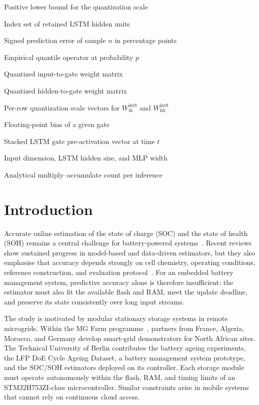 \documentclass[review]{elsarticle}
\begin{document}
\begin{description}[style=multiline,leftmargin=1.5cm,font=\bfseries]
\item[$\varepsilon_q$] Positive lower bound for the quantization scale
\item[$\mathcal{R}$] Index set of retained LSTM hidden units
\item[$e_n$] Signed prediction error of sample $n$ in percentage points
\item[$Q_p(\cdot)$] Empirical quantile operator at probability $p$
\item[$W_{\mathrm{ih}}^{\mathrm{int8}}$] Quantized input-to-gate weight matrix
\item[$W_{\mathrm{hh}}^{\mathrm{int8}}$] Quantized hidden-to-gate weight matrix
\item[$s_{\mathrm{ih}}, s_{\mathrm{hh}}$] Per-row quantization scale vectors for $W_{\mathrm{ih}}^{\mathrm{int8}}$ and $W_{\mathrm{hh}}^{\mathrm{int8}}$
\item[$b_{\mathrm{fp32}}$] Floating-point bias of a given gate
\item[$\mathbf{a}_t$] Stacked LSTM gate pre-activation vector at time $t$
\item[$D,H,M$] Input dimension, LSTM hidden size, and MLP width
\item[$N_{\mathrm{MAC}}$] Analytical multiply--accumulate count per inference
\end{description}
\normalsize
\section{Introduction}
Accurate online estimation of the state of charge (SOC) and the state of health (SOH) remains a central challenge for battery-powered systems~\cite{yaoSmarterBatteryManagement2025a,a.m.s.m.h.s.attanayakaEstimationStateCharge2019,berecibarCriticalReviewState2016,shrivastavaReviewTechnologicalAdvancement2023}. Recent reviews show sustained progress in model-based and data-driven estimators, but they also emphasise that accuracy depends strongly on cell chemistry, operating conditions, reference construction, and evaluation protocol~\cite{guoSystematicReviewElectrochemical2024,yaoSmarterBatteryManagement2025a}. For an embedded battery management system, predictive accuracy alone is therefore insufficient: the estimator must also fit the available flash and RAM, meet the update deadline, and preserve its state consistently over long input streams.

The study is motivated by modular stationary storage systems in remote microgrids. Within the MG Farm programme~\cite{leap-reMGFARMSmart,microenergyMGFARMPoweringSustainable,aqachtoulMGFARMIoTEdgeDriven2026,technischeuniversitatberlinMGFarmSmart}, partners from France, Algeria, Morocco, and Germany develop smart-grid demonstrators for North African sites. The Technical University of Berlin contributes the battery ageing experiments, the LFP DoE Cycle Ageing Dataset, a battery management system prototype, and the SOC/SOH estimators deployed on its controller. Each storage module must operate autonomously within the flash, RAM, and timing limits of an STM32H753ZI-class microcontroller. Similar constraints arise in mobile systems that cannot rely on continuous cloud access.
\end{document}
